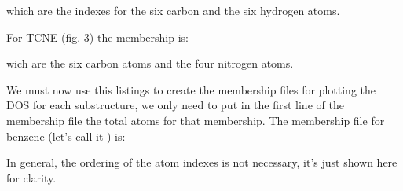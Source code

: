 \documentclass[letterpaper,10pt,english,openany,oneside]{sphinxmanual}
\begin{document}
\begin{sphinxVerbatim}[commandchars=\\\{\}]

\end{sphinxVerbatim}

\sphinxAtStartPar
which are the indexes for the six carbon and the six hydrogen atoms.

\begin{figure}[htbp]
\centering

\noindent{}
\end{figure}

\sphinxAtStartPar
For TCNE (fig. 3) the membership is:

\begin{sphinxVerbatim}[commandchars=\\\{\}]

\end{sphinxVerbatim}

\sphinxAtStartPar
wich are the six carbon atoms and the four nitrogen atoms.

\begin{figure}[htbp]
\centering

\noindent{}
\end{figure}

\sphinxAtStartPar
We must now use this listings to create the membership files for plotting the DOS for each substructure, we only need to put in the first line of the membership file the total atoms for that membership. The membership file for benzene (let’s call it ) is:

\begin{sphinxVerbatim}[commandchars=\\\{\}]
\end{sphinxVerbatim}

\sphinxAtStartPar
In general, the ordering of the atom indexes is not necessary, it’s just shown here for clarity.
\end{document}
